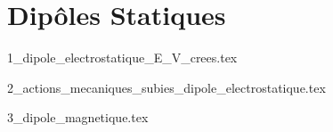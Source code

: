 \chapter{Dipôles Statiques}

\minitoc

{1_dipole_electrostatique_E_V_crees.tex}

{2_actions_mecaniques_subies_dipole_electrostatique.tex}

{3_dipole_magnetique.tex}